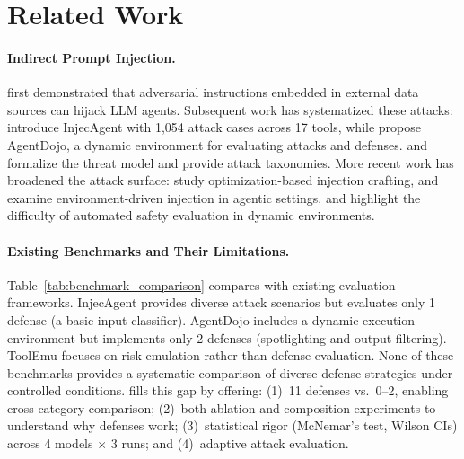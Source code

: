 \section{Related Work}
\label{sec:related}

\paragraph{Indirect Prompt Injection.}
\citet{greshake2023youve} first demonstrated that adversarial instructions embedded in external data sources can hijack LLM agents.
Subsequent work has systematized these attacks: \citet{zhan2024injecagent} introduce InjecAgent with 1{,}054 attack cases across 17 tools, while \citet{debenedetti2024agentdojo} propose AgentDojo, a dynamic environment for evaluating attacks and defenses.
\citet{yi2023benchmarking} and \citet{liu2024formalizing} formalize the threat model and provide attack taxonomies.
More recent work has broadened the attack surface: \citet{shi2025optimization} study optimization-based injection crafting, and \citet{liao2025eia} examine environment-driven injection in agentic settings.
\citet{yuan2024rjudge} and \citet{debenedetti2024agentdojo} highlight the difficulty of automated safety evaluation in dynamic environments.

\paragraph{Existing Benchmarks and Their Limitations.}
Table~\ref{tab:benchmark_comparison} compares \asb{} with existing evaluation frameworks.
InjecAgent provides diverse attack scenarios but evaluates only 1 defense (a basic input classifier).
AgentDojo includes a dynamic execution environment but implements only 2 defenses (spotlighting and output filtering).
ToolEmu \citep{wu2024toolemu} focuses on risk emulation rather than defense evaluation.
None of these benchmarks provides a systematic comparison of diverse defense strategies under controlled conditions.
\asb{} fills this gap by offering: (1)~11 defenses vs.\ 0--2, enabling cross-category comparison; (2)~both ablation and composition experiments to understand why defenses work; (3)~statistical rigor (McNemar's test, Wilson CIs) across 4 models $\times$ 3 runs; and (4)~adaptive attack evaluation.

